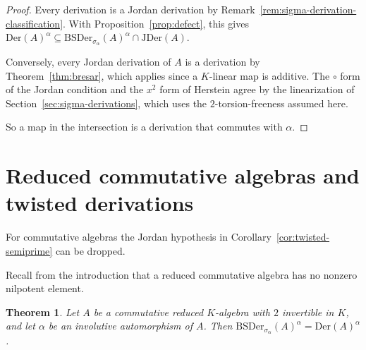 \documentclass[]{interact}
\theoremstyle{plain}
\newtheorem{theorem}{Theorem}[section]
\theoremstyle{definition}
\theoremstyle{remark}
\newcommand{\Der}{\mathrm{Der}}
\newcommand{\JDer}{\mathrm{JDer}}
\newcommand{\BSDer}{\mathrm{BSDer}}
\begin{document}
\begin{proof}
Every derivation is a Jordan derivation by Remark~\ref{rem:sigma-derivation-classification}.
With Proposition~\ref{prop:defect}, this gives $\Der(A)^\alpha \subseteq \BSDer_{\sigma_\alpha}(A)^\alpha \cap \JDer(A)$.

Conversely, every Jordan derivation of $A$ is a derivation by Theorem~\ref{thm:bresar}, which applies since a $K$-linear map is additive.
The $\circ$ form of the Jordan condition and the $x^2$ form of Herstein agree by the linearization of Section~\ref{sec:sigma-derivations}, which uses the $2$-torsion-freeness assumed here.

So a map in the intersection is a derivation that commutes with $\alpha$.
\end{proof}

\section{Reduced commutative algebras and twisted derivations}\label{sec:twisted-commutative}

For commutative algebras the Jordan hypothesis in Corollary~\ref{cor:twisted-semiprime} can be dropped.

Recall from the introduction that a reduced commutative algebra has no nonzero nilpotent element. %

\begin{theorem}\label{thm:twisted-commutative}
Let $A$ be a commutative reduced $K$-algebra with $2$ invertible in $K$, and let $\alpha$ be an involutive automorphism of $A$.
Then $\BSDer_{\sigma_\alpha}(A)^\alpha = \Der(A)^\alpha$.
\end{theorem}
\end{document}

